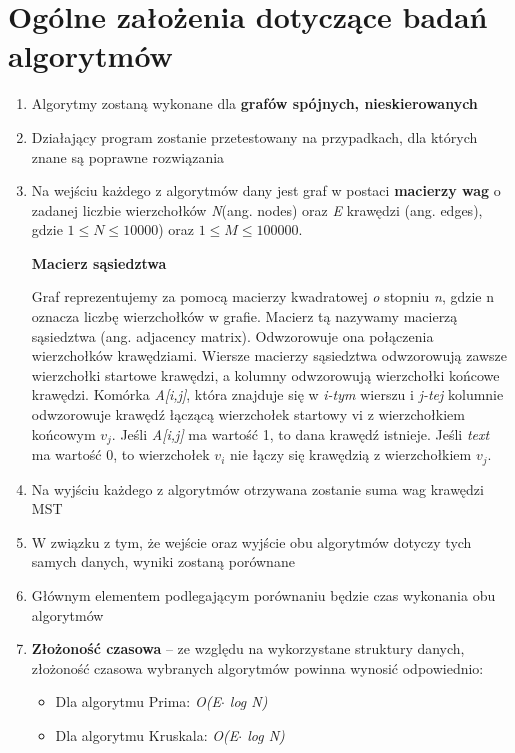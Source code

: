 \section{Ogólne założenia dotyczące badań algorytmów}
\begin{enumerate}
	\item Algorytmy zostaną wykonane dla \textbf{grafów spójnych, nieskierowanych}
	\item Działający program zostanie przetestowany na przypadkach, dla których znane są poprawne rozwiązania 
	\item Na wejściu każdego z algorytmów dany jest graf w postaci \textbf{macierzy wag} o zadanej liczbie wierzchołków \emph{N}(ang. nodes) oraz \emph{E} krawędzi (ang. edges), gdzie $1 \leqslant N \leqslant 10000$) oraz $1 \leqslant M \leqslant 100000$.
	\begin{center}
		\textbf{Macierz sąsiedztwa}
	\end{center}
Graf reprezentujemy za pomocą macierzy kwadratowej \emph o stopniu \emph{n}, gdzie n oznacza liczbę wierzchołków w grafie. Macierz tą nazywamy macierzą sąsiedztwa (ang. adjacency matrix). Odwzorowuje ona połączenia wierzchołków krawędziami. Wiersze macierzy sąsiedztwa odwzorowują zawsze wierzchołki startowe krawędzi, a kolumny odwzorowują wierzchołki końcowe krawędzi. Komórka \emph{A[i,j]}, która znajduje się w\emph{ i-tym} wierszu i \emph{j-tej } kolumnie odwzorowuje krawędź łączącą wierzchołek startowy vi z wierzchołkiem końcowym \emph{$v_{j}$}. Jeśli \emph{A[i,j]} ma wartość 1, to dana krawędź istnieje. Jeśli \emph{text} ma wartość 0, to wierzchołek \emph{$v_{i}$} nie łączy się krawędzią z wierzchołkiem \emph{$v_{j}$}.
\item Na wyjściu każdego z algorytmów otrzywana zostanie suma wag krawędzi MST
\item W związku z tym, że wejście oraz wyjście obu algorytmów dotyczy tych samych danych, wyniki zostaną porównane
\item Głównym elementem podlegającym porównaniu będzie czas wykonania obu algorytmów
\item \textbf{Złożoność czasowa} -- ze względu na wykorzystane struktury danych, złożoność czasowa wybranych algorytmów powinna wynosić odpowiednio:
\begin{itemize}
	\item Dla algorytmu Prima: \emph{O(E$\cdot$ log N)}
	\item Dla algorytmu Kruskala: \emph{O(E$\cdot$ log N)}
\end{itemize}
\end{enumerate}